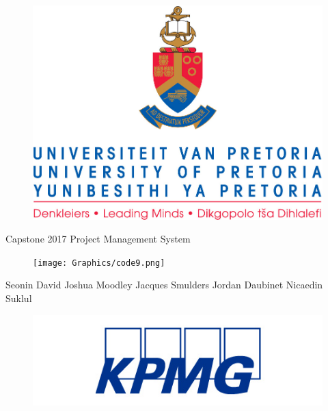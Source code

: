 \documentclass[a4paper,12pt]{article}
\begin{document}
\selectfont
    \begin{center}\thispagestyle{empty}
    	\begin{figure}[h]
			\centering
			\includegraphics[width=0.60\linewidth]{Graphics/uplogo.jpg}
	 	\end{figure}
    
        \newline
        {\Huge{}\selectfont 
        Capstone 2017 \linebreak
        Project Management System \linebreak 
        \par}
        
        \begin{figure}[h]
			\centering
			\texttt{[image: Graphics/code9.png]}
	    \end{figure} 
        
        \begin{LARGE}\selectfont
            Seonin David
            \linebreak
            \linebreak
            Joshua Moodley
            \linebreak
            \linebreak
            Jacques Smulders
            \linebreak
            \linebreak
            Jordan Daubinet
            \linebreak
            \linebreak
            Nicaedin Suklul
        \end{LARGE}
    \end{center}
    
    \begin{figure}[b]
			\centering
			\includegraphics[width=0.3\linewidth]{Graphics/kpmgLogo.jpg}
	\end{figure}  
    
\end{document}
